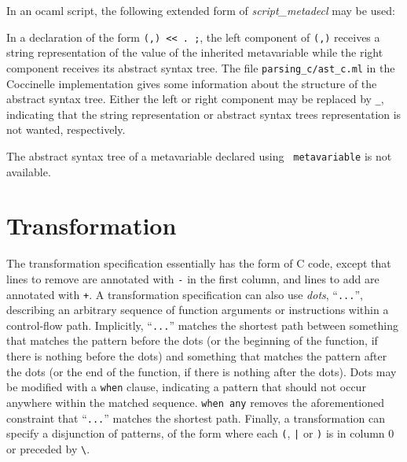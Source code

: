 In an ocaml script, the following extended form of \textit{script\_metadecl}
may be used:

\begin{grammar}
\end{grammar}

\noindent
In a declaration of the form \texttt{(,) <{}<
  . ;}, the left component of \texttt{(,)}
receives a string representation of the value of the inherited metavariable
while the right component receives its abstract syntax tree.  The file
\texttt{parsing\_c/ast\_c.ml} in the Coccinelle implementation gives some
information about the structure of the abstract syntax tree.  Either the
left or right component may be replaced by \verb+_+, indicating that the
string representation or abstract syntax trees representation is not
wanted, respectively.

The abstract syntax tree of a metavariable declared using {\tt
  metavariable} is not available.

\section{Transformation}

The transformation specification essentially has the form of C code, except
that lines to remove are annotated with \verb+-+ in the first column, and
lines to add are annotated with \verb-+-.  A transformation specification
can also use {\em dots}, ``\verb-...-'', describing an arbitrary sequence
of function arguments or instructions within a control-flow path.
Implicitly, ``\verb-...-'' matches the shortest path between something that
matches the pattern before the dots (or the beginning of the function, if
there is nothing before the dots) and something that matches the pattern
after the dots (or the end of the function, if there is nothing after the
dots).  Dots may be modified with a {\tt when} clause, indicating a pattern
that should not occur anywhere within the matched sequence.  {\tt when any}
removes the aforementioned constraint that ``\verb-...-'' matches the
shortest path.  Finally, a transformation can specify a disjunction of
patterns, of the form  where each \texttt{(}, \texttt{|} or \texttt{)} is
in column 0 or preceded by \texttt{\textbackslash}.

